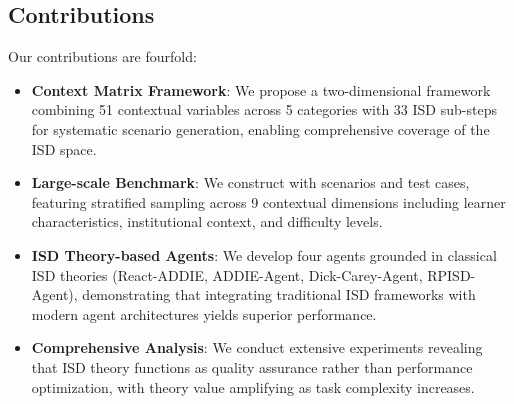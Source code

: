 \subsection{Contributions}
\label{subsec:contributions}

Our contributions are fourfold:

\begin{itemize}
    \item \textbf{Context Matrix Framework}: We propose a two-dimensional framework combining 51 contextual variables across 5 categories with 33 ISD sub-steps for systematic scenario generation, enabling comprehensive coverage of the ISD space.

    \item \textbf{Large-scale Benchmark}: We construct \benchmark{} with \numscenarios{} scenarios and \numtest{} test cases, featuring stratified sampling across 9 contextual dimensions including learner characteristics, institutional context, and difficulty levels.

    \item \textbf{ISD Theory-based Agents}: We develop four agents grounded in classical ISD theories (React-ADDIE, ADDIE-Agent, Dick-Carey-Agent, RPISD-Agent), demonstrating that integrating traditional ISD frameworks with modern agent architectures yields superior performance.

    \item \textbf{Comprehensive Analysis}: We conduct extensive experiments revealing that ISD theory functions as quality assurance rather than performance optimization, with theory value amplifying as task complexity increases.
\end{itemize}
